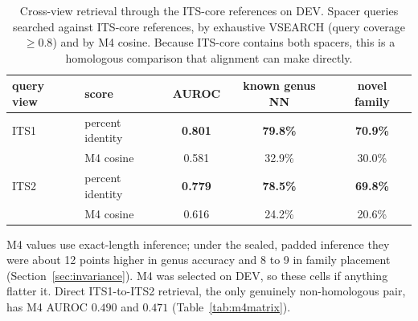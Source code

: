 \begin{table}[htbp]\centering
\begin{threeparttable}
\caption{Cross-view retrieval through the ITS-core references on DEV. Spacer queries searched against ITS-core references, by exhaustive VSEARCH (query coverage $\geq0.8$) and by M4 cosine. Because ITS-core contains both spacers, this is a homologous comparison that alignment can make directly.}
\label{tab:crossview}
\small
\begin{tabular}{llccc}
\toprule
query view & score & AUROC & known genus NN & novel family \\
\midrule
ITS1 & percent identity & \textbf{0.801} & \textbf{79.8\%} & \textbf{70.9\%} \\
 & M4 cosine & 0.581 & 32.9\% & 30.0\% \\
\addlinespace
ITS2 & percent identity & \textbf{0.779} & \textbf{78.5\%} & \textbf{69.8\%} \\
 & M4 cosine & 0.616 & 24.2\% & 20.6\% \\
\bottomrule
\end{tabular}
\begin{tablenotes}\footnotesize
\item M4 values use exact-length inference; under the sealed, padded inference they were about 12 points higher in genus accuracy and 8 to 9 in family placement (Section~\ref{sec:invariance}). M4 was selected on DEV, so these cells if anything flatter it. Direct ITS1-to-ITS2 retrieval, the only genuinely non-homologous pair, has M4 AUROC $0.490$ and $0.471$ (Table~\ref{tab:m4matrix}).
\end{tablenotes}
\end{threeparttable}
\end{table}
